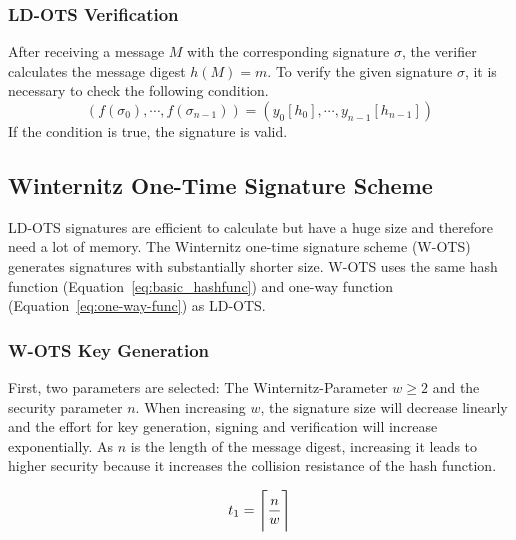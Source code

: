 \subsubsection{LD-OTS Verification}
After receiving a message $M$ with the corresponding signature $\sigma$, the verifier calculates the message digest $h(M) = m$. 
To verify the given signature $\sigma$, it is necessary to check the following condition.
\begin{equation}
\left(
f(\sigma_0), \cdots, f(\sigma_{n-1})
\right) =
\left(
y_0[h_0], \cdots, y_{n-1}[h_{n-1}]
\right)
\end{equation}
If the condition is true, the signature is valid.


\subsection{Winternitz One-Time Signature Scheme}
LD-OTS signatures are efficient to calculate but have a huge size and therefore need a lot of memory. The Winternitz one-time signature scheme (W-OTS) generates signatures with substantially shorter size. W-OTS uses the same hash function (Equation~\ref{eq:basic_hashfunc}) and one-way function (Equation~\ref{eq:one-way-func}) as LD-OTS. %

\subsubsection{W-OTS Key Generation}
\label{sec:WOTS_keygen}
First, two parameters are selected: The Winternitz-Parameter $w \geq 2$ and the security parameter $n$. When increasing $w$, the signature size will decrease linearly and the effort for key generation, signing and verification will increase exponentially. As $n$ is the length of the message digest, increasing it leads to higher security because it increases the collision resistance of the hash function. %

\begin{equation}
\label{eq:t1}
t_1 = \ceil[\Bigg]{\frac{n}{w}}
\end{equation}

